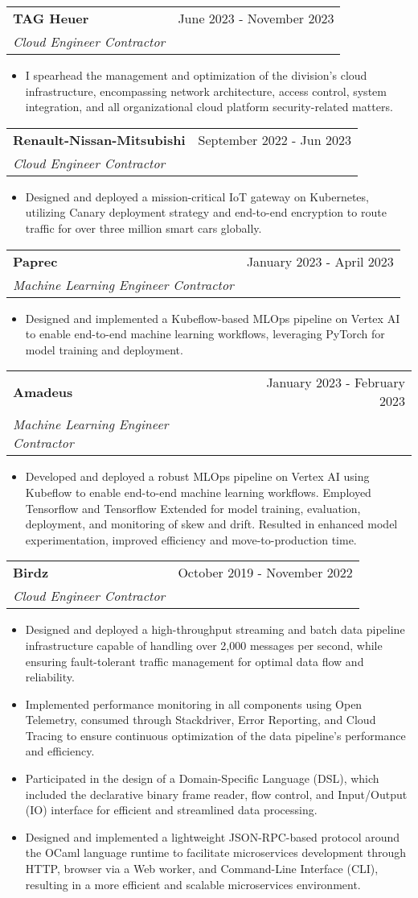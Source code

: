 \documentclass[letterpaper,11pt]{article}
\makeatletter
\newcommand{\resumeItem}[1]{
  \item\small{#1 \vspace{-2pt}}
}
\newcommand{\resumeSubheading}[3]{
  \vspace{-1pt}\item
    \begin{tabular*}{0.97\textwidth}[t]{l@{\extracolsep{\fill}}r}
      \textbf{#1} & #2 \\
      \textit{\small #3} \\
    \end{tabular*}\vspace{-5pt}
}
\newcommand{\resumeItemListStart}{\begin{itemize}}
\newcommand{\resumeItemListEnd}{\end{itemize}\vspace{-5pt}}
\makeatother
\begin{document}
\resumeSubheading{TAG Heuer}
{June 2023 - November 2023}
{Cloud Engineer Contractor}
\resumeItemListStart{}
\resumeItem{
	I spearhead the management and optimization of the division's cloud
	infrastructure, encompassing network architecture, access control, system
	integration, and all organizational cloud platform security-related matters.
}
\resumeItemListEnd{}


\resumeSubheading{Renault-Nissan-Mitsubishi}
{September 2022 - Jun 2023}
{Cloud Engineer Contractor}
\resumeItemListStart{}
\resumeItem{
	Designed and deployed a mission-critical IoT gateway on Kubernetes, utilizing
	Canary deployment strategy and end-to-end encryption to route traffic for over
	three million smart cars globally.
}
\resumeItemListEnd{}


\resumeSubheading{Paprec}
{January 2023 - April 2023}
{Machine Learning Engineer Contractor}
\resumeItemListStart{}
\resumeItem{
	Designed and implemented a Kubeflow-based MLOps pipeline on Vertex AI to enable
	end-to-end machine learning workflows, leveraging PyTorch for model training and
	deployment.
}
\resumeItemListEnd{}


\resumeSubheading{Amadeus}
{January 2023 - February 2023}
{Machine Learning Engineer Contractor}
\resumeItemListStart{}
\resumeItem{
	Developed and deployed a robust MLOps pipeline on Vertex AI using Kubeflow to
	enable end-to-end machine learning workflows. Employed Tensorflow and Tensorflow
	Extended for model training, evaluation, deployment, and monitoring of skew and
	drift. Resulted in enhanced model experimentation, improved efficiency and
	move-to-production time.
}
\resumeItemListEnd{}


\resumeSubheading{Birdz}
{October 2019 - November 2022}
{Cloud Engineer Contractor}
\resumeItemListStart{}
\resumeItem{
	Designed and deployed a high-throughput streaming and batch data pipeline
	infrastructure capable of handling over 2,000 messages per second, while ensuring
	fault-tolerant traffic management for optimal data flow and reliability.
}
\resumeItem{
	Implemented performance monitoring in all components using Open Telemetry,
	consumed through Stackdriver, Error Reporting, and Cloud Tracing to ensure
	continuous optimization of the data pipeline's performance and efficiency.
}
\resumeItem{
	Participated in the design of a Domain-Specific Language (DSL), which included the
	declarative binary frame reader, flow control, and Input/Output (IO) interface
	for efficient and streamlined data processing.
}
\resumeItem{
	Designed and implemented a lightweight JSON-RPC-based protocol around the
	OCaml language runtime to facilitate microservices development through HTTP,
	browser via a Web worker, and Command-Line Interface (CLI), resulting in a more
	efficient and scalable microservices environment.
}
\resumeItemListEnd{}
\end{document}
